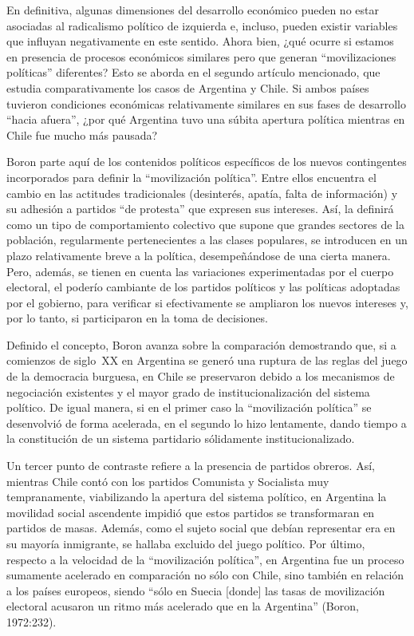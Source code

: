 En definitiva, algunas dimensiones del desarrollo económico pueden no estar asociadas al radicalismo político de izquierda e, incluso, pueden existir variables que influyan negativamente en este sentido. Ahora bien, ¿qué ocurre si estamos en presencia de procesos económicos similares pero que generan ``movilizaciones políticas'' diferentes? Esto se aborda en el segundo artículo mencionado, que estudia comparativamente los casos de Argentina y Chile. Si ambos países tuvieron condiciones económicas relativamente similares en sus fases de desarrollo ``hacia afuera'', ¿por qué Argentina tuvo una súbita apertura política mientras en Chile fue mucho más pausada?

Boron parte aquí de los contenidos políticos específicos de los nuevos contingentes incorporados para definir la ``movilización política''. Entre ellos encuentra el cambio en las actitudes tradicionales (desinterés, apatía, falta de información) y su adhesión a partidos ``de protesta'' que expresen sus intereses. Así, la definirá como un tipo de comportamiento colectivo que supone que grandes sectores de la población, regularmente pertenecientes a las clases populares, se introducen en un plazo relativamente breve a la política, desempeñándose de una cierta manera. Pero, además, se tienen en cuenta las variaciones experimentadas por el cuerpo electoral, el poderío cambiante de los partidos políticos y las políticas adoptadas por el gobierno, para verificar si efectivamente se ampliaron los nuevos intereses y, por lo tanto, si participaron en la toma de decisiones.

Definido el concepto, Boron avanza sobre la comparación demostrando que, si a comienzos de siglo~XX en Argentina se generó una ruptura de las reglas del juego de la democracia burguesa, en Chile se preservaron debido a los mecanismos de negociación existentes y el mayor grado de institucionalización del sistema político. De igual manera, si en el primer caso la ``movilización política'' se desenvolvió de forma acelerada, en el segundo lo hizo lentamente, dando tiempo a la constitución de un sistema partidario sólidamente institucionalizado.

Un tercer punto de contraste refiere a la presencia de partidos obreros. Así, mientras Chile contó con los partidos Comunista y Socialista muy tempranamente, viabilizando la apertura del sistema político, en Argentina la movilidad social ascendente impidió que estos partidos se transformaran en partidos de masas. Además, como el sujeto social que debían representar era en su mayoría inmigrante, se hallaba excluido del juego político. Por último, respecto a la velocidad de la ``movilización política'', en Argentina fue un proceso sumamente acelerado en comparación no sólo con Chile, sino también en relación a los países europeos, siendo ``sólo en Suecia [donde] las tasas de movilización electoral acusaron un ritmo más acelerado que en la Argentina'' (Boron, 1972:232).

